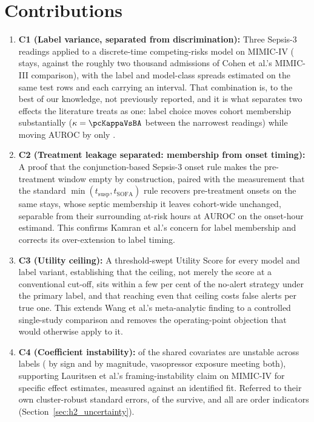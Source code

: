 \section{Contributions}

\begin{enumerate}
    \item \textbf{C1 (Label variance, separated from discrimination):} Three
    Sepsis-3 readings applied to a discrete-time competing-risks model on
    MIMIC-IV (\pcNStays{} stays, against the roughly two thousand admissions of
    Cohen et al.'s MIMIC-III comparison), with the label and model-class
    spreads estimated on the same test rows and each carrying an interval. That
    combination is, to the best of our knowledge, not previously reported, and
    it is what separates two effects the literature treats as one: label choice
    moves cohort membership substantially ($\kappa = \pcKappaVsBA$ between the
    narrowest readings) while moving AUROC by only \pcSpreadLabel.

    \item \textbf{C2 (Treatment leakage separated: membership from onset
    timing):} A proof that
    the conjunction-based Sepsis-3 onset rule makes the pre-treatment window
    empty by construction, paired with the measurement that the standard
    $\min(t_{\text{susp}}, t_{\text{SOFA}})$ rule recovers
    \pcPreTreatOnsetsVarF{} pre-treatment onsets on the same stays, whose septic
    membership it leaves cohort-wide unchanged,
    separable from their surrounding at-risk hours at
    \pcPreTreatAurocPrimaryF{} AUROC on the onset-hour estimand. This confirms Kamran et al.'s
    \cite{kamran2024evaluation} concern for label membership and corrects its
    over-extension to label timing.

    \item \textbf{C3 (Utility ceiling):} A threshold-swept Utility Score for
    every model and label variant, establishing that the ceiling, not merely
    the score at a conventional cut-off, sits within a few per cent of the
    no-alert strategy under the primary label, and that reaching even that
    ceiling costs
    \pcUtilityOptBurdenGbtB{} false alerts per true one. This extends Wang et
    al.'s \cite{wang2025srpm} meta-analytic finding to a controlled
    single-study comparison and removes the operating-point objection that
    would otherwise apply to it.

    \item \textbf{C4 (Coefficient instability):} \pcHTwoEst{} of the
    \pcHTwoNTerms{} shared covariates are unstable across labels
    (\pcHTwoNSign{} by sign and \pcHTwoNMag{} by magnitude, vasopressor
    exposure meeting both), supporting Lauritsen et al.'s
    \cite{lauritsen2021framing} framing-instability claim on MIMIC-IV for
    specific effect estimates, measured against an identified fit. Referred to
    their own cluster-robust standard errors, \pcHTwoNRobust{} of the
    \pcHTwoNFlagged{} survive, and all \pcHTwoNRobust{} are order indicators
    (Section~\ref{sec:h2_uncertainty}).


\end{enumerate}
